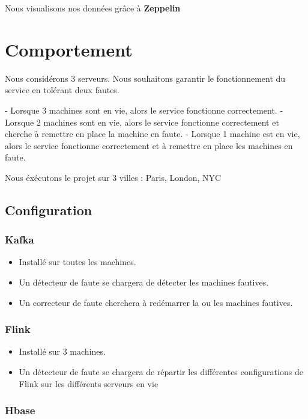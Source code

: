 \documentclass[a4paper,oneside,12pt]{article}
\begin{document}
Nous visualisons nos données grâce à \textbf{Zeppelin}

\pagebreak
\section{Comportement}

Nous considérons 3 serveurs. Nous souhaitons garantir le fonctionnement du service en tolérant deux fautes. 

- Lorsque 3 machines sont en vie, alors le service fonctionne correctement.
- Lorsque 2 machines sont en vie, alors le service fonctionne correctement et cherche à remettre en place la machine en faute.
- Lorsque 1 machine est en vie, alors le service fonctionne correctement et à remettre en place les machines en faute. 

Nous éxécutons le projet sur 3 villes : Paris, London, NYC

\subsection{Configuration}

\subsubsection{Kafka}

\begin{itemize}
\item Installé sur toutes les machines. 
\item Un détecteur de faute se chargera de détecter les machines fautives.
\item Un correcteur de faute cherchera à redémarrer la ou les machines fautives.
\end{itemize}

\subsubsection{Flink}

\begin{itemize}
\item Installé sur 3 machines. 
\item Un détecteur de faute se chargera de répartir les différentes configurations de Flink sur les différents serveurs en vie
\end{itemize}

\subsubsection{Hbase}
\end{document}
